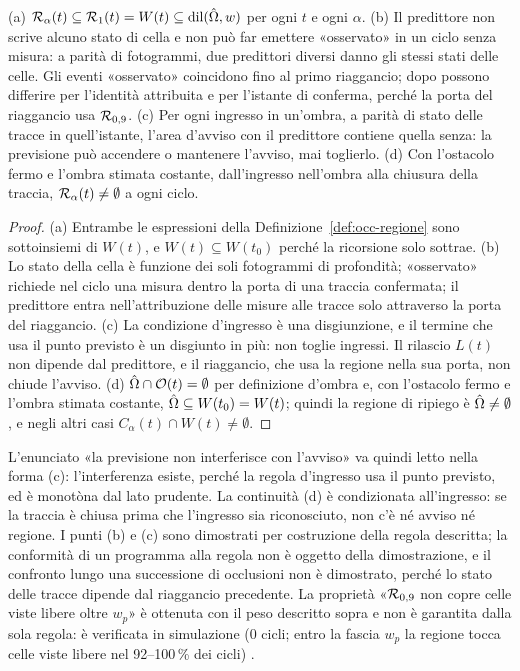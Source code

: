 \begin{proposizione}\label{prop:occ-annidamento}
(a) $\mathcal{R}_\alpha(t)\subseteq\mathcal{R}_1(t)=W(t)\subseteq\operatorname{dil}(\hat{\Omega},w)$ per ogni $t$ e ogni $\alpha$. (b) Il predittore non scrive alcuno stato di cella e non può far emettere «osservato» in un ciclo senza misura: a parità di fotogrammi, due predittori diversi danno gli stessi stati delle celle. Gli eventi «osservato» coincidono fino al primo riaggancio; dopo possono differire per l'identità attribuita e per l'istante di conferma, perché la porta del riaggancio usa $\mathcal{R}_{0,9}$. (c) Per ogni ingresso in un'ombra, a parità di stato delle tracce in quell'istante, l'area d'avviso con il predittore contiene quella senza: la previsione può accendere o mantenere l'avviso, mai toglierlo. (d) Con l'ostacolo fermo e l'ombra stimata costante, dall'ingresso nell'ombra alla chiusura della traccia, $\mathcal{R}_\alpha(t)\neq\emptyset$ a ogni ciclo. 
\end{proposizione}
\begin{proof}
(a) Entrambe le espressioni della Definizione~\ref{def:occ-regione} sono sottoinsiemi di $W(t)$, e $W(t)\subseteq W(t_0)$ perché la ricorsione solo sottrae. (b) Lo stato della cella è funzione dei soli fotogrammi di profondità; «osservato» richiede nel ciclo una misura dentro la porta di una traccia confermata; il predittore entra nell'attribuzione delle misure alle tracce solo attraverso la porta del riaggancio. (c) La condizione d'ingresso è una disgiunzione, e il termine che usa il punto previsto è un disgiunto in più: non toglie ingressi. Il rilascio $L(t)$ non dipende dal predittore, e il riaggancio, che usa la regione nella sua porta, non chiude l'avviso. (d) $\hat{\Omega}\cap\mathcal{O}(t)=\emptyset$ per definizione d'ombra e, con l'ostacolo fermo e l'ombra stimata costante, $\hat{\Omega}\subseteq W(t_0)=W(t)$; quindi la regione di ripiego è $\hat{\Omega}\neq\emptyset$, e negli altri casi $C_\alpha(t)\cap W(t)\neq\emptyset$.
\end{proof}

L'enunciato «la previsione non interferisce con l'avviso» va quindi letto nella forma (c): l'interferenza esiste, perché la regola d'ingresso usa il punto previsto, ed è monotòna dal lato prudente. La continuità (d) è condizionata all'ingresso: se la traccia è chiusa prima che l'ingresso sia riconosciuto, non c'è né avviso né regione. I punti (b) e (c) sono dimostrati per costruzione della regola descritta; la conformità di un programma alla regola non è oggetto della dimostrazione, e il confronto lungo una successione di occlusioni non è dimostrato, perché lo stato delle tracce dipende dal riaggancio precedente. La proprietà «$\mathcal{R}_{0,9}$ non copre celle viste libere oltre $w_p$» è ottenuta con il peso descritto sopra e non è garantita dalla sola regola: è verificata in simulazione (0 cicli; entro la fascia $w_p$ la regione tocca celle viste libere nel 92--100\,\% dei cicli) .

